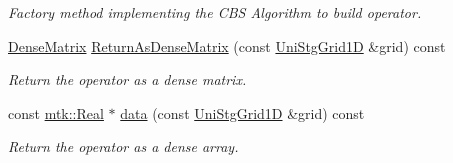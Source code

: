 \begin{DoxyCompactItemize}
\begin{DoxyCompactList}\small\item\em Factory method implementing the C\+B\+S Algorithm to build operator. \end{DoxyCompactList}\item 
\hyperlink{classmtk_1_1DenseMatrix}{Dense\+Matrix} \hyperlink{classmtk_1_1Lap1D_aaea34a17b0879e05eb4109645a2ba8f4}{Return\+As\+Dense\+Matrix} (const \hyperlink{classmtk_1_1UniStgGrid1D}{Uni\+Stg\+Grid1\+D} \&grid) const 
\begin{DoxyCompactList}\small\item\em Return the operator as a dense matrix. \end{DoxyCompactList}\item 
const \hyperlink{group__c01-roots_gac080bbbf5cbb5502c9f00405f894857d}{mtk\+::\+Real} $\ast$ \hyperlink{classmtk_1_1Lap1D_ab2652725a8407c79247680c7bbd073b8}{data} (const \hyperlink{classmtk_1_1UniStgGrid1D}{Uni\+Stg\+Grid1\+D} \&grid) const 
\begin{DoxyCompactList}\small\item\em Return the operator as a dense array. \end{DoxyCompactList}\end{DoxyCompactItemize}
